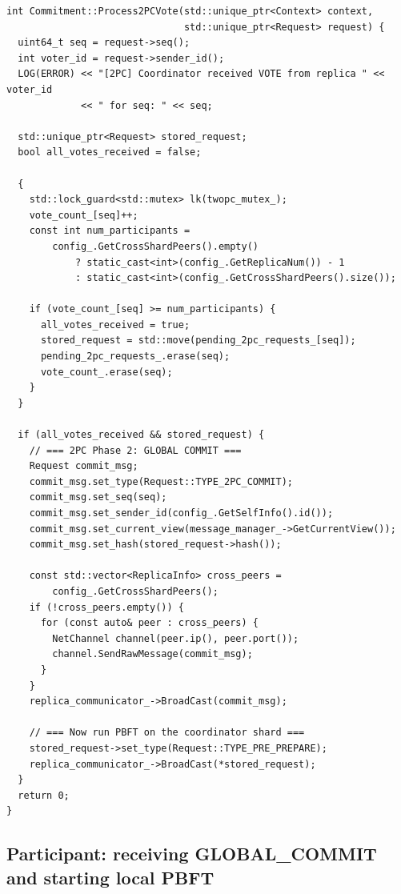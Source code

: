 \documentclass[11pt]{article}
\begin{document}
\begin{lstlisting}[style=cppstyle,caption={\texttt{platform/consensus/ordering/pbft/commitment.cpp} -- \texttt{Process2PCVote}: count votes, fan out GLOBAL\_COMMIT, start PBFT.}]
int Commitment::Process2PCVote(std::unique_ptr<Context> context,
                               std::unique_ptr<Request> request) {
  uint64_t seq = request->seq();
  int voter_id = request->sender_id();
  LOG(ERROR) << "[2PC] Coordinator received VOTE from replica " << voter_id
             << " for seq: " << seq;

  std::unique_ptr<Request> stored_request;
  bool all_votes_received = false;

  {
    std::lock_guard<std::mutex> lk(twopc_mutex_);
    vote_count_[seq]++;
    const int num_participants =
        config_.GetCrossShardPeers().empty()
            ? static_cast<int>(config_.GetReplicaNum()) - 1
            : static_cast<int>(config_.GetCrossShardPeers().size());

    if (vote_count_[seq] >= num_participants) {
      all_votes_received = true;
      stored_request = std::move(pending_2pc_requests_[seq]);
      pending_2pc_requests_.erase(seq);
      vote_count_.erase(seq);
    }
  }

  if (all_votes_received && stored_request) {
    // === 2PC Phase 2: GLOBAL COMMIT ===
    Request commit_msg;
    commit_msg.set_type(Request::TYPE_2PC_COMMIT);
    commit_msg.set_seq(seq);
    commit_msg.set_sender_id(config_.GetSelfInfo().id());
    commit_msg.set_current_view(message_manager_->GetCurrentView());
    commit_msg.set_hash(stored_request->hash());

    const std::vector<ReplicaInfo> cross_peers =
        config_.GetCrossShardPeers();
    if (!cross_peers.empty()) {
      for (const auto& peer : cross_peers) {
        NetChannel channel(peer.ip(), peer.port());
        channel.SendRawMessage(commit_msg);
      }
    }
    replica_communicator_->BroadCast(commit_msg);

    // === Now run PBFT on the coordinator shard ===
    stored_request->set_type(Request::TYPE_PRE_PREPARE);
    replica_communicator_->BroadCast(*stored_request);
  }
  return 0;
}
\end{lstlisting}

\subsection{Participant: receiving GLOBAL\_COMMIT and starting local PBFT}
\end{document}
